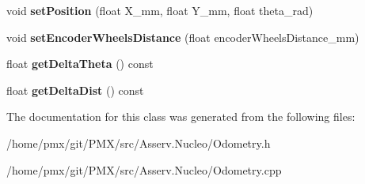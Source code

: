 \begin{DoxyCompactItemize}
void {\bfseries set\+Position} (float X\+\_\+mm, float Y\+\_\+mm, float theta\+\_\+rad)
\item 
\mbox{\label{classOdometry_a186e488bca0a852687d1ba0a1e30564f}} 
void {\bfseries set\+Encoder\+Wheels\+Distance} (float encoder\+Wheels\+Distance\+\_\+mm)
\item 
\mbox{\label{classOdometry_ac64611ad6e55de402d5f46edab33b72f}} 
float {\bfseries get\+Delta\+Theta} () const
\item 
\mbox{\label{classOdometry_a0ca1d351add931b26940f2829a0667dc}} 
float {\bfseries get\+Delta\+Dist} () const
\end{DoxyCompactItemize}


The documentation for this class was generated from the following files\+:\begin{DoxyCompactItemize}
\item 
/home/pmx/git/\+P\+M\+X/src/\+Asserv.\+Nucleo/Odometry.\+h\item 
/home/pmx/git/\+P\+M\+X/src/\+Asserv.\+Nucleo/Odometry.\+cpp\end{DoxyCompactItemize}
